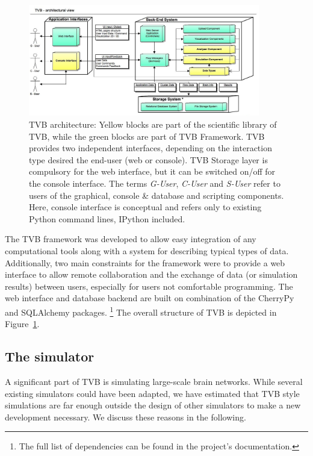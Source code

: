  \begin{figure}
        \centering
        \includegraphics[width=0.90\textwidth]{images/architecture.jpg}
        \caption{TVB architecture: Yellow blocks are part of the scientific
            library of TVB, while the green blocks are part of TVB Framework.
            TVB provides two independent interfaces, depending on the
            interaction type desired the end-user (web or console).  TVB
            Storage layer is compulsory for the web interface, but it can be
	    switched on/off for the console interface.  The terms \textit{G-User},
	    \textit{C-User} and \textit{S-User} refer to users of the graphical,
	    console \& database and scripting components. Here, console interface
	    is conceptual and refers only to existing Python command lines, IPython
	    included. 
         }
        \label{fig:architecture}
 \end{figure}

The TVB framework was developed to allow easy integration of any
computational tools along with a system for describing typical types of data.
Additionally, 
two main constraints for the framework were to provide a web
interface to allow remote collaboration and the
exchange of data (or simulation results) between users, especially for
users not comfortable programming. The web interface
and database backend are built on combination of 
the \textsf{CherryPy} and \textsf{SQLAlchemy} packages.
\footnote{The full list of dependencies can be found in the
project's documentation.}
The overall structure of TVB is depicted in Figure~\ref{fig:architecture}.

\subsection{The simulator}

A significant part of TVB is simulating large-scale brain networks. While
several existing simulators could have been adapted, we have estimated that
TVB style simulations are far enough outside the design of other simulators to
make a new development necessary. We discuss these reasons in the following. 


